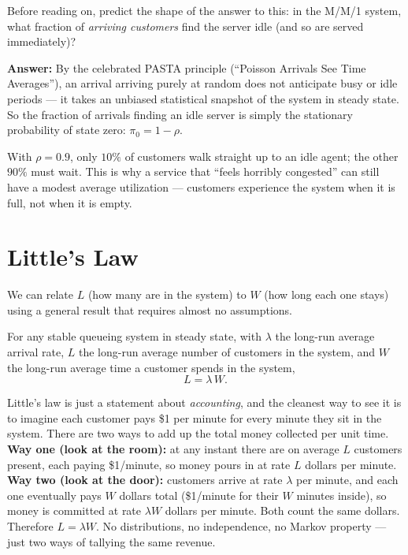 \begin{labbox}
Before reading on, predict the shape of the answer to this: in the M/M/1 system, what fraction of
\emph{arriving customers} find the server idle (and so are served immediately)?

\textbf{Answer:} By the celebrated PASTA principle (``Poisson Arrivals See Time Averages''), an
arrival arriving purely at random does not anticipate busy or idle periods --- it takes an unbiased
statistical snapshot of the system in steady state. So the fraction of arrivals finding an idle
server is simply the stationary probability of state zero: $\pi_0 = 1 - \rho$.

With $\rho = 0.9$, only $10\%$ of customers walk straight up to an idle agent; the other $90\%$ must
wait. This is why a service that ``feels horribly congested'' can still have a modest average
utilization --- customers experience the system when it is full, not when it is empty.
\end{labbox}

\section{Little's Law}
\label{ch27:little}

We can relate $L$ (how many are in the system) to $W$ (how long each one stays) using a general result that requires almost no assumptions.

\begin{theorem}
\label{ch27:thm-little}
For any stable queueing system in steady state, with $\lambda$ the long-run average arrival rate,
$L$ the long-run average number of customers in the system, and $W$ the long-run average time a
customer spends in the system,
\[
  \boxed{\,L = \lambda\, W.\,}
\]
\end{theorem}

\begin{intuitionbox}
Little's law is just a statement about \emph{accounting}, and the cleanest way to see it is to
imagine each customer pays \$1 per minute for every minute they sit in the system. There are two ways
to add up the total money collected per unit time. \textbf{Way one (look at the room):} at any
instant there are on average $L$ customers present, each paying \$1/minute, so money pours in at rate
$L$ dollars per minute. \textbf{Way two (look at the door):} customers arrive at rate $\lambda$ per
minute, and each one eventually pays $W$ dollars total (\$1/minute for their $W$ minutes inside), so
money is committed at rate $\lambda W$ dollars per minute. Both count the same dollars. Therefore
$L = \lambda W$. No distributions, no independence, no Markov property --- just two ways of
tallying the same revenue.
\end{intuitionbox}

